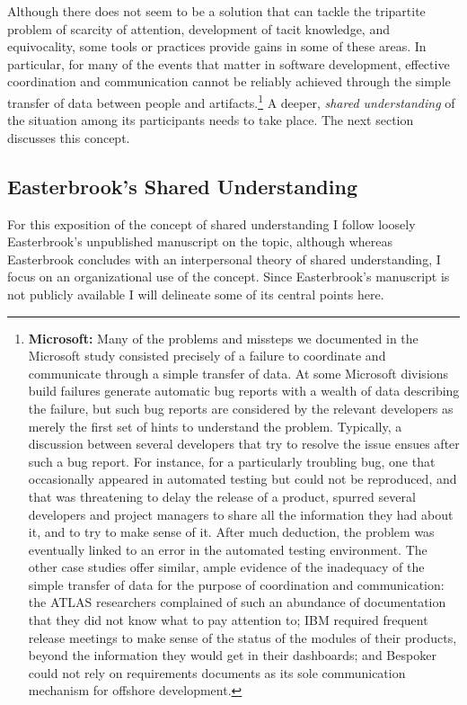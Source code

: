 Although there does not seem to be a solution that can tackle the tripartite problem of scarcity of attention, development of tacit knowledge, and equivocality, some tools or practices provide gains in some of these areas. In particular, for many of the events that matter in software development, effective coordination and communication cannot be reliably achieved through the simple transfer of data between people and artifacts.\footnote{\textbf{Microsoft:} Many of the problems and missteps we documented in the Microsoft study consisted precisely of a failure to coordinate and communicate through a simple transfer of data. At some Microsoft divisions build failures generate automatic bug reports with a wealth of data describing the failure, but such bug reports are considered by the relevant developers as merely the first set of hints to understand the problem. Typically, a discussion between several developers that try to resolve the issue ensues after such a bug report. For instance, for a particularly troubling bug, one that occasionally appeared in automated testing but could not be reproduced, and that was threatening to delay the release of a product, spurred several developers and project managers to share all the information they had about it, and to try to make sense of it. After much deduction, the problem was eventually linked to an error in the automated testing environment. The other case studies offer similar, ample evidence of the inadequacy of the simple transfer of data for the purpose of coordination and communication: the ATLAS researchers complained of such an abundance of documentation that they did not know what to pay attention to; IBM required frequent release meetings to make sense of the status of the modules of their products, beyond the information they would get in their dashboards; and Bespoker could not rely on requirements documents as its sole communication mechanism for offshore development.} A deeper, \emph{shared understanding} of the situation among its participants needs to take place. The next section discusses this concept.


\subsection{Easterbrook's Shared Understanding}

For this exposition of the concept of shared understanding I follow loosely Easterbrook's  unpublished manuscript on the topic, although whereas Easterbrook concludes with an interpersonal theory of shared understanding, I focus on an organizational use of the concept. Since Easterbrook's manuscript is not publicly available I will delineate some of its central points here.

